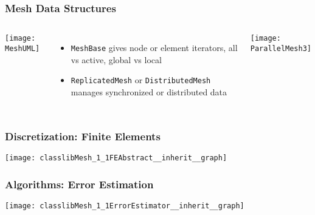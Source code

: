 \begin{frame}
\frametitle{Mesh Data Structures}
\begin{columns}
\begin{center}
\texttt{[image: MeshUML]}
\end{center}
\begin{itemize}
\item \texttt{MeshBase} gives node or element iterators, all vs active, global vs local
\item \texttt{ReplicatedMesh} or \texttt{DistributedMesh} manages synchronized or distributed data
\end{itemize}

\texttt{[image: ParallelMesh3]}
\end{columns}

\end{frame}



\frame
{
  \frametitle{Discretization: Finite Elements}
  \begin{center}
    \texttt{[image: classlibMesh\_1\_1FEAbstract\_\_inherit\_\_graph]}
  \end{center}
}      



\frame
{
  \frametitle{Algorithms: Error Estimation}
  \begin{center}
    \texttt{[image: classlibMesh\_1\_1ErrorEstimator\_\_inherit\_\_graph]}
  \end{center}
}



